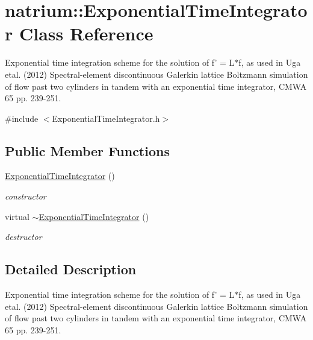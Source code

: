 \hypertarget{classnatrium_1_1ExponentialTimeIntegrator}{\section{natrium\-:\-:Exponential\-Time\-Integrator Class Reference}
\label{classnatrium_1_1ExponentialTimeIntegrator}
}


Exponential time integration scheme for the solution of f' = L$\ast$f, as used in Uga etal. (2012) Spectral-\/element discontinuous Galerkin lattice Boltzmann simulation of flow past two cylinders in tandem with an exponential time integrator, C\-M\-W\-A 65 pp. 239-\/251.  




{\ttfamily \#include $<$Exponential\-Time\-Integrator.\-h$>$}

\subsection*{Public Member Functions}
\begin{DoxyCompactItemize}
\item 
\hypertarget{classnatrium_1_1ExponentialTimeIntegrator_a91472d03faddf0e2166fb5d77e6cb062}{\hyperlink{classnatrium_1_1ExponentialTimeIntegrator_a91472d03faddf0e2166fb5d77e6cb062}{Exponential\-Time\-Integrator} ()}\label{classnatrium_1_1ExponentialTimeIntegrator_a91472d03faddf0e2166fb5d77e6cb062}

\begin{DoxyCompactList}\small\item\em constructor \end{DoxyCompactList}\item 
\hypertarget{classnatrium_1_1ExponentialTimeIntegrator_a7114f9845feb896b3129492de36a60b3}{virtual \hyperlink{classnatrium_1_1ExponentialTimeIntegrator_a7114f9845feb896b3129492de36a60b3}{$\sim$\-Exponential\-Time\-Integrator} ()}\label{classnatrium_1_1ExponentialTimeIntegrator_a7114f9845feb896b3129492de36a60b3}

\begin{DoxyCompactList}\small\item\em destructor \end{DoxyCompactList}\end{DoxyCompactItemize}


\subsection{Detailed Description}
Exponential time integration scheme for the solution of f' = L$\ast$f, as used in Uga etal. (2012) Spectral-\/element discontinuous Galerkin lattice Boltzmann simulation of flow past two cylinders in tandem with an exponential time integrator, C\-M\-W\-A 65 pp. 239-\/251. 

